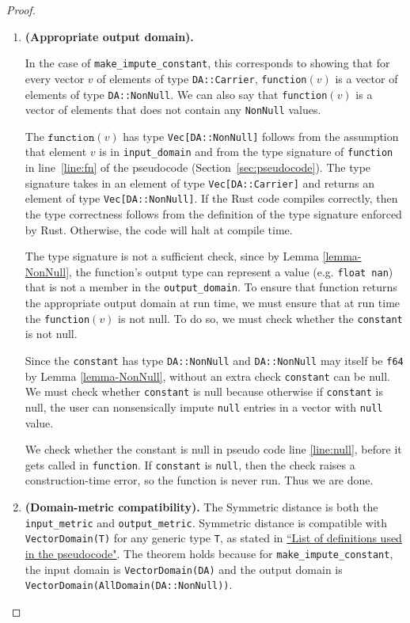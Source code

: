 \documentclass[11pt,a4paper]{article}
\newcommand{\grace}[1]{{ {\color{purple}{(grace)~#1}}}}
\newcommand{\function}{\texttt{function}}
\begin{document}
\begin{proof}
\begin{enumerate}

\item \textbf{(Appropriate output domain).} 

In the case of \texttt{make\_impute\_constant}, this corresponds to showing that for every vector $v$ of elements of type \texttt{DA::Carrier},  \texttt{function}$(v)$ is a vector of elements of type \texttt{DA::NonNull}. We can also say that \texttt{function}$(v)$ is a vector of elements that does not contain any \texttt{NonNull} values.

The $\function(v)$ has type \texttt{Vec[DA::NonNull]} follows from the assumption that element $v$ is in \texttt{input\_domain} and from the type signature of \texttt{function} in line~\ref{line:fn} of the pseudocode (Section~\ref{sec:pseudocode}). The type signature takes in an element of type \texttt{Vec[DA::Carrier]} and returns an element of type \texttt{Vec[DA::NonNull]}. If the Rust code compiles correctly, then the type correctness follows from the definition of the type signature enforced by Rust. Otherwise, the code will halt at compile time.

The type signature is not a sufficient check, since by Lemma \ref{lemma-NonNull}, the function's output type can represent a value (e.g. \texttt{float nan}) that is not a member in the \texttt{output\_domain}. \grace{How do I clarify that the output domain should actually contain NO NULLS since in the code it's loose?} To ensure that function returns the appropriate output domain at run time, we must ensure that at run time the \texttt{function}$(v)$ is not null. To do so, we must check whether the \texttt{constant} is not null.

Since the \texttt{constant} has type \texttt{DA::NonNull} and \texttt{DA::NonNull} may itself be \texttt{f64} by Lemma \ref{lemma-NonNull}, without an extra check \texttt{constant} can be null. We must check whether \texttt{constant} is null because otherwise if \texttt{constant} is null, the user can nonsensically impute \texttt{null} entries in a vector with \texttt{null} value. 

We check whether the constant is null in pseudo code line \ref{line:null}, before it gets called in \texttt{function}. If \texttt{constant} is \texttt{null}, then the check raises a construction-time error, so the function is never run. Thus we are done.

\grace{I didn't use the fact that v is of type DA::Carrier. (?)}
\item \textbf{(Domain-metric compatibility).} The Symmetric distance is both the \texttt{input\_metric} and \texttt{output\_metric}. Symmetric distance is compatible with \texttt{VectorDomain(T)} for any generic type \texttt{T}, as stated in \href{https://www.overleaf.com/project/60d215bf90b337ac02200a99}{``List of definitions used in the pseudocode"}. The theorem holds because for \texttt{make\_impute\_constant}, the input domain is \texttt{VectorDomain(DA)} and the output domain is \texttt{VectorDomain(AllDomain(DA::NonNull))}. 


\end{enumerate}
\end{proof}
\end{document}
